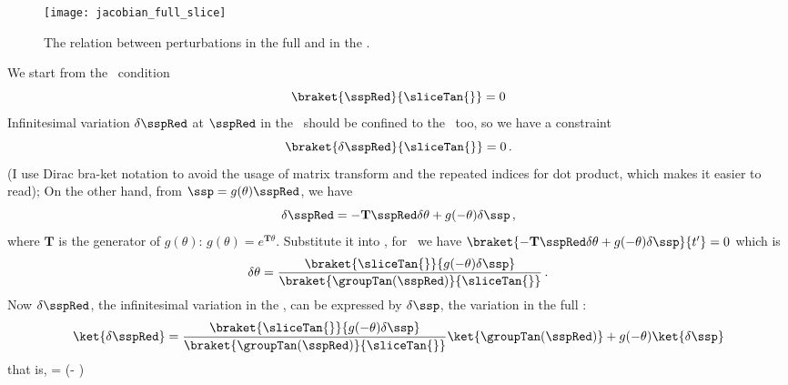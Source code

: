 \begin{figure}[h]
  \centering
  \texttt{[image: jacobian\_full\_slice]}
  \caption{The relation between perturbations in
    the full {\statesp} and in the \slice.}
  \label{fig:jacobian_full_slice}
\end{figure}
We start from the \slice\ condition
\begin{equation}
\braket{\sspRed}{\sliceTan{}}=0
\label{eq:slicecondition}
\end{equation}
Infinitesimal variation $\delta \sspRed$ at $\sspRed$ in the \slice\
should be confined to the \slice\ too, so we have a constraint
\begin{equation}
\braket{\delta \sspRed}{\sliceTan{}}=0
\,.
\label{eq:constraint_dx}
\end{equation}
(I use Dirac bra-ket notation to avoid the usage of matrix transform
and the repeated indices for dot product, which makes it easier to read);
 On the other hand, from $\ssp=g(\theta)\sspRed$, we have
\[
\delta \sspRed=-\mathbf{T}\sspRed\delta \theta+g(-\theta)\delta\ssp
\,,
\]
where $\mathbf{T}$ is the generator of $g(\theta)$:
$g(\theta)=e^{\mathbf{T}\theta}$. Substitute it into ,
for \SOn{2}\
we have $\braket{-\mathbf{T}\sspRed\delta \theta+g(-\theta)\delta\ssp}{t'}=0$
 which is
\begin{equation}
  \label{eq:delta_theta}
  \delta \theta=
      \frac{\braket{\sliceTan{}}{g(-\theta)\delta\ssp}}
            {\braket{\groupTan(\sspRed)}{\sliceTan{}}}
\,.
\end{equation}
Now  $\delta \sspRed$, the infinitesimal variation in the \slice, can be
expressed by  $\delta\ssp$, the variation in the full {\statesp}:
\begin{align*}
  \ket{\delta \sspRed} &=
\frac{\braket{\sliceTan{}}{g(-\theta)\delta\ssp}}
            {\braket{\groupTan(\sspRed)}{\sliceTan{}}}
     \ket{\groupTan(\sspRed)}
    +g(-\theta)\ket{\delta \ssp}\\
\end{align*}
that is,
\beq
\label{eq:variation_full_slice}
\ket{\delta \sspRed} =
    \left(\matId-\frac{\ket{\groupTan(\sspRed)}\bra{\sliceTan{}}}
    {\braket{\groupTan(\sspRed)}{\sliceTan{}}} \right)
    \ket{g(-\theta)\delta \ssp}
